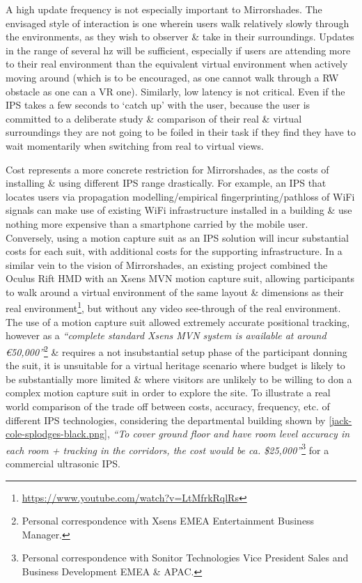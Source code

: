 A high update frequency is not especially important to Mirrorshades. The envisaged style of interaction is one wherein users walk relatively slowly through the environments, as they wish to observer \& take in their surroundings. Updates in the range of several hz will be sufficient, especially if users are attending more to their real environment than the equivalent virtual environment when actively moving around (which is to be encouraged, as one cannot walk through a RW obstacle as one can a VR one). Similarly, low latency is not critical. Even if the IPS takes a few seconds to `catch up' with the user, because the user is committed to a deliberate study \& comparison of their real \& virtual surroundings they are not going to be foiled in their task if they find they have to wait momentarily when switching from real to virtual views.

Cost represents a more concrete restriction for Mirrorshades, as the costs of installing \& using different IPS range drastically. For example, an IPS that locates users via propagation modelling/empirical fingerprinting/pathloss of WiFi signals can make use of existing WiFi infrastructure installed in a building \& use nothing more expensive than a smartphone carried by the mobile user. Conversely, using a motion capture suit as an IPS solution will incur substantial costs for each suit, with additional costs for the supporting infrastructure. In a similar vein to the vision of Mirrorshades, an existing project combined the Oculus Rift HMD with an Xsens MVN motion capture suit, allowing participants to walk around a virtual environment of the same layout \& dimensions as their real environment\footnote{\url{https://www.youtube.com/watch?v=LtMfrkRqlRs}}, but without any video see-through of the real environment. The use of a motion capture suit allowed extremely accurate positional tracking, however as a \textit{``complete standard Xsens MVN system is available at around \euro{}50,000''}\footnote{Personal correspondence with Xsens EMEA Entertainment Business Manager.} \& requires a not insubstantial setup phase of the participant donning the suit, it is unsuitable for a virtual heritage scenario where budget is likely to be substantially more limited \&  where visitors are unlikely to be willing to don a complex motion capture suit in order to explore the site. To illustrate a real world comparison of the trade off between costs, accuracy, frequency, etc. of different IPS technologies, considering the departmental building shown by \ref{jack-cole-splodges-black.png}, \textit{``To cover ground floor and have room level accuracy in each room + tracking in the corridors, the cost would be ca. \$25,000''}\footnote{Personal correspondence with Sonitor Technologies Vice President Sales and Business Development EMEA \& APAC.} for a commercial ultrasonic IPS.

